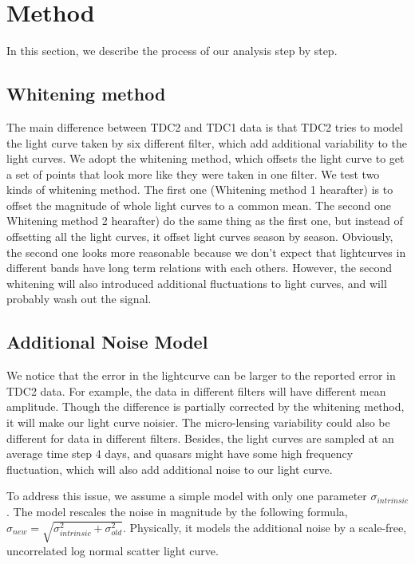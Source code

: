 \documentclass[\docopts]{\docclass}
\begin{document}
\section{Method}
\label{sec:method}

In this section, we describe the process of our analysis step by step.

\subsection{Whitening method}

The main difference between TDC2 and TDC1 data is that TDC2 tries to model the light curve taken by six different filter, which add additional variability to the light curves. We adopt the whitening method, which offsets the light curve to get a set of points that look more like they were taken in one filter. We test two kinds of whitening method. The first one (Whitening method 1 hearafter) is to offset  the magnitude of whole light curves to a common mean. The second one Whitening method 2 hearafter) do the same thing as the first one, but instead of offsetting all the light curves, it offset light curves season by season. Obviously, the second one looks more reasonable because we don't expect that lightcurves in different bands have long term relations with each others. However, the second whitening will also introduced additional fluctuations to light curves, and will probably wash out the signal.


\subsection{Additional Noise Model}
We notice that the error in the lightcurve can be larger to the reported error in TDC2 data. For example, the data in different filters will have different mean amplitude. Though the difference is partially corrected by the whitening method, it will make our light curve noisier. The micro-lensing variability could also be different for data in different filters. Besides, the light curves are sampled at an average time step 4 days, and quasars might have some high frequency fluctuation, which will also add additional noise to our light curve.

To address this issue, we assume a simple model with only one parameter $\sigma_{intrinsic}$. The model rescales the noise in magnitude by the following formula, $\sigma_{new}=\sqrt{\sigma_{intrinsic}^2+\sigma_{old}^2}$.  Physically, it models the additional noise by a scale-free, uncorrelated log normal scatter light curve.
\end{document}
